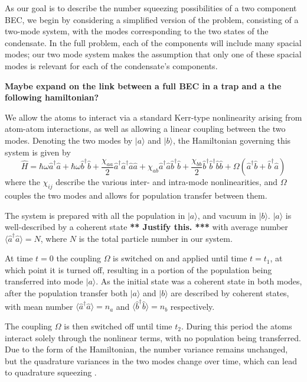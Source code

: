 \documentclass[12pt]{iopart}
\begin{document}
As our goal is to describe the number squeezing possibilities of a two component BEC, we begin by considering a simplified version of the problem, consisting of a two-mode system, with the modes corresponding to the two states of the condensate. In the full problem, each of the components will include many spacial modes; our two mode system makes the assumption that only one of these spacial modes is relevant for each of the condensate's components.

{\bf{Maybe expand on the link between a full BEC in a trap and a the following hamiltonian?}}

We allow the atoms to interact via a standard Kerr-type nonlinearity arising from atom-atom interactions, as well as allowing a linear coupling between the two modes. Denoting the two modes by $|a\rangle$ and $|b\rangle$, the Hamiltonian governing this system is given by
\begin{equation}
\hat{H} = \hbar \omega \hat{a}^{\dagger} \hat{a} +  \hbar \omega \hat{b}^{\dagger} \hat{b} 
          + \frac{\chi_{aa}}{2} \hat{a}^{\dagger} \hat{a}^{\dagger} \hat{a} \hat{a}
          + \chi_{ab} \hat{a}^{\dagger} \hat{a} \hat{b}^{\dagger} \hat{b}
          + \frac{\chi_{bb}}{2} \hat{b}^{\dagger} \hat{b}^{\dagger} \hat{b} \hat{b}
          + \Omega (\hat{a}^{\dagger} \hat{b} + \hat{b}^{\dagger}  \hat{a} )
\label{eqTwoModeHamiltonian}
\end{equation}
where the $\chi_{ij}$ describe the various inter- and intra-mode nonlinearities, and $\Omega$ couples the two modes and allows for population transfer between them.

The system is prepared with all the population in $|a\rangle$, and vacuum in $|b\rangle$. $|a\rangle$ is well-described by a coherent state {\bf *** Justify this. ***} with average number $\langle \hat{a}^{\dagger} \hat{a} \rangle = N$, where $N$ is the total particle number in our system.

At time $t=0$ the coupling $\Omega$ is switched on and applied until time $t=t_1$, at which point it is turned off, resulting in a portion of the population being transferred into mode $|a\rangle$. As the initial state was a coherent state in both modes, after the population transfer both $|a\rangle$ and $|b\rangle$ are described by coherent states, with mean number $\langle \hat{a}^{\dagger} \hat{a} \rangle = n_a$ and $\langle \hat{b}^{\dagger} \hat{b} \rangle = n_b$ respectively.

The coupling $\Omega$ is then switched off until time $t_2$. During this period the atoms interact solely through the nonlinear terms, with no population being transferred. Due to the form of the Hamiltonian, the number variance remains unchanged, but the quadrature variances in the two modes change over time, which can lead to quadrature squeezing \cite{xxx}.
\end{document}
